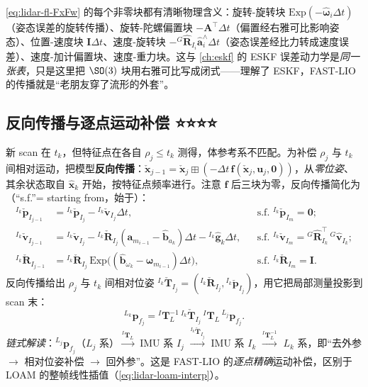 \begin{insight}
\cref{eq:lidar-fl-FxFw} 的每个非零块都有清晰物理含义：旋转-旋转块 $\mathrm{Exp}(-\hat{\boldsymbol{\omega}}_i\Delta t)$（姿态误差的旋转传播）、旋转-陀螺偏置块 $-\mathbf{A}^\top\Delta t$（偏置经右雅可比影响姿态）、位置-速度块 $\mathbf{I}\Delta t$、速度-旋转块 $-{}^G\hat{\mathbf{R}}_{I_i}\hat{\mathbf{a}}_i^\wedge\Delta t$（姿态误差经比力转成速度误差）、速度-加计偏置块、速度-重力块。这与 \cref{ch:eskf} 的 ESKF 误差动力学是\emph{同一张表}，只是这里把 $\SO(3)$ 块用右雅可比写成闭式——理解了 ESKF，FAST-LIO 的传播就是“老朋友穿了流形的外套”。
\end{insight}

\subsection{反向传播与逐点运动补偿 ⭐⭐⭐⭐}
\label{sec:lidar-fl-bwd}

新 scan 在 $t_k$，但特征点在各自 $\rho_j\le t_k$ 测得，体参考系不匹配。为补偿 $\rho_j$ 与 $t_k$ 间相对运动，把模型\textbf{反向传播}\cite{xu2021fastlio}：$\check{\mathbf{x}}_{j-1}=\check{\mathbf{x}}_j\boxplus(-\Delta t\,\mathbf{f}(\check{\mathbf{x}}_j,\mathbf{u}_j,\mathbf{0}))$，从\emph{零位姿}、其余状态取自 $\hat{\mathbf{x}}_k$ 开始，按特征点频率进行。注意 $\mathbf{f}$ 后三块为零，反向传播简化为（“s.f.”= starting from，始于）：
\begin{equation}
\begin{aligned}
{}^{I_k}\check{\mathbf{p}}_{I_{j-1}}&={}^{I_k}\check{\mathbf{p}}_{I_j}-{}^{I_k}\check{\mathbf{v}}_{I_j}\Delta t, &&\text{s.f. }{}^{I_k}\check{\mathbf{p}}_{I_m}=\mathbf{0};\\
{}^{I_k}\check{\mathbf{v}}_{I_{j-1}}&={}^{I_k}\check{\mathbf{v}}_{I_j}-{}^{I_k}\check{\mathbf{R}}_{I_j}(\mathbf{a}_{m_{i-1}}-\hat{\mathbf{b}}_{a_k})\Delta t-{}^{I_k}\hat{\mathbf{g}}_k\Delta t, &&\text{s.f. }{}^{I_k}\check{\mathbf{v}}_{I_m}={}^G\hat{\mathbf{R}}_{I_k}^\top\,{}^G\hat{\mathbf{v}}_{I_k};\\
{}^{I_k}\check{\mathbf{R}}_{I_{j-1}}&={}^{I_k}\check{\mathbf{R}}_{I_j}\,\mathrm{Exp}\big((\hat{\mathbf{b}}_{\omega_k}-\boldsymbol{\omega}_{m_{i-1}})\Delta t\big), &&\text{s.f. }{}^{I_k}\check{\mathbf{R}}_{I_m}=\mathbf{I}.
\end{aligned}
\label{eq:lidar-fl-bwd}
\end{equation}
反向传播给出 $\rho_j$ 与 $t_k$ 间相对位姿 ${}^{I_k}\check{\mathbf{T}}_{I_j}=({}^{I_k}\check{\mathbf{R}}_{I_j},{}^{I_k}\check{\mathbf{p}}_{I_j})$，用它把局部测量投影到 scan 末：
\begin{equation}
  {}^{L_k}\mathbf{p}_{f_j}={}^I\mathbf{T}_L^{-1}\,{}^{I_k}\check{\mathbf{T}}_{I_j}\,{}^I\mathbf{T}_L\,{}^{L_j}\mathbf{p}_{f_j}.
  \label{eq:lidar-fl-project}
\end{equation}
\emph{链式解读}：${}^{L_j}\mathbf{p}_{f_j}$（$L_j$ 系）$\xrightarrow{{}^I\mathbf{T}_L}$ IMU 系 $I_j$ $\xrightarrow{{}^{I_k}\check{\mathbf{T}}_{I_j}}$ IMU 系 $I_k$ $\xrightarrow{{}^I\mathbf{T}_L^{-1}}$ $L_k$ 系，即“去外参 $\to$ 相对位姿补偿 $\to$ 回外参”。这是 FAST-LIO 的\emph{逐点精确}运动补偿，区别于 LOAM 的整帧线性插值（\cref{eq:lidar-loam-interp}）。

